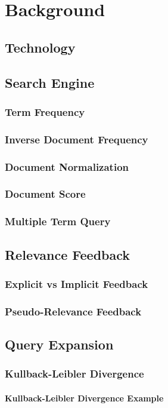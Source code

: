 \chapter{Background}
\label{ch:background}

\section{Technology}

\section{Search Engine}

\subsection{Term Frequency}

\subsection{Inverse Document Frequency}

\subsection{Document Normalization}

\subsection{Document Score}
\label{sec:doc-score}

\subsection{Multiple Term Query}

\section{Relevance Feedback}

\subsection{Explicit vs Implicit Feedback}

\subsection{Pseudo-Relevance Feedback}

\section{Query Expansion}
\label{sec:query-expansion}

\subsection{Kullback-Leibler Divergence}

\subsubsection{Kullback-Leibler Divergence Example}
